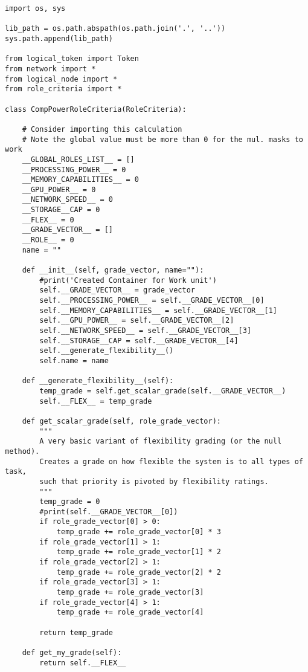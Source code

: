 \documentclass[11pt]{article}
\begin{document}
\lstset{frame=single, caption=Framework Listing}
\begin{lstlisting}
import os, sys

lib_path = os.path.abspath(os.path.join('.', '..'))
sys.path.append(lib_path)

from logical_token import Token
from network import *
from logical_node import *
from role_criteria import *

class CompPowerRoleCriteria(RoleCriteria):

    # Consider importing this calculation
    # Note the global value must be more than 0 for the mul. masks to work
    __GLOBAL_ROLES_LIST__ = []
    __PROCESSING_POWER__ = 0
    __MEMORY_CAPABILITIES__ = 0
    __GPU_POWER__ = 0
    __NETWORK_SPEED__ = 0
    __STORAGE__CAP = 0
    __FLEX__ = 0
    __GRADE_VECTOR__ = []
    __ROLE__ = 0
    name = ""

    def __init__(self, grade_vector, name=""):
        #print('Created Container for Work unit')
        self.__GRADE_VECTOR__ = grade_vector
        self.__PROCESSING_POWER__ = self.__GRADE_VECTOR__[0]
        self.__MEMORY_CAPABILITIES__ = self.__GRADE_VECTOR__[1]
        self.__GPU_POWER__ = self.__GRADE_VECTOR__[2]
        self.__NETWORK_SPEED__ = self.__GRADE_VECTOR__[3]
        self.__STORAGE__CAP = self.__GRADE_VECTOR__[4]
        self.__generate_flexibility__()
        self.name = name

    def __generate_flexibility__(self):
        temp_grade = self.get_scalar_grade(self.__GRADE_VECTOR__)
        self.__FLEX__ = temp_grade

    def get_scalar_grade(self, role_grade_vector):
        """
        A very basic variant of flexibility grading (or the null method).
        Creates a grade on how flexible the system is to all types of task,
        such that priority is pivoted by flexibility ratings.
        """
        temp_grade = 0
        #print(self.__GRADE_VECTOR__[0])
        if role_grade_vector[0] > 0:
            temp_grade += role_grade_vector[0] * 3
        if role_grade_vector[1] > 1:
            temp_grade += role_grade_vector[1] * 2
        if role_grade_vector[2] > 1:
            temp_grade += role_grade_vector[2] * 2
        if role_grade_vector[3] > 1:
            temp_grade += role_grade_vector[3]
        if role_grade_vector[4] > 1:
            temp_grade += role_grade_vector[4]

        return temp_grade

    def get_my_grade(self):
        return self.__FLEX__


\end{lstlisting}
\end{document}

